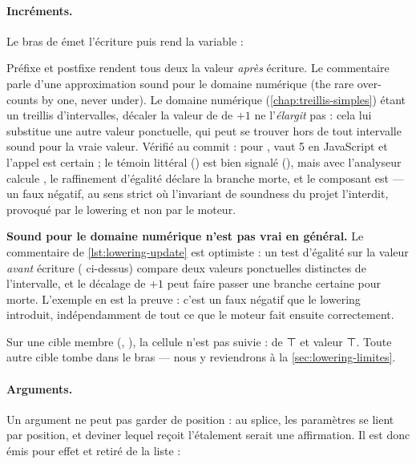 \paragraph{Incréments.} Le bras de  émet l'écriture puis rend la variable :


Préfixe et postfixe rendent tous deux la valeur \emph{après} écriture. Le commentaire parle d'une approximation sound \og pour le domaine numérique\fg{} (\og the rare  over-counts by one, never under\fg{}). Le domaine numérique (\cref{chap:treillis-simples}) étant un treillis d'intervalles, décaler la valeur de  de $+1$ ne l'\emph{élargit} pas : cela lui substitue une autre valeur ponctuelle, qui peut se trouver hors de tout intervalle sound pour la vraie valeur. Vérifié au commit \snapshotCommit{} : pour ,  vaut 5 en JavaScript et l'appel est certain ; le témoin littéral () est bien signalé (), mais avec  l'analyseur calcule , le raffinement d'égalité déclare la branche  morte, et le composant est  --- un faux négatif, au sens strict où l'invariant de soundness du projet l'interdit, provoqué par le lowering et non par le moteur.

\begin{piege}
\textbf{\og Sound pour le domaine numérique\fg{} n'est pas vrai en général.} Le commentaire de \cref{lst:lowering-update} est optimiste : un test d'égalité sur la valeur \emph{avant} écriture ( ci-dessus) compare deux valeurs ponctuelles distinctes de l'intervalle, et le décalage de $+1$ peut faire passer une branche certaine pour morte. L'exemple  en est la preuve : c'est un faux négatif que le lowering introduit, indépendamment de tout ce que le moteur fait ensuite correctement.
\end{piege}

Sur une cible membre (, ), la cellule n'est pas suivie :  de ⊤ et valeur ⊤. Toute autre cible tombe dans le bras  --- nous y reviendrons à la \cref{sec:lowering-limites}.

\paragraph{Arguments.} Un argument  ne peut pas garder de position : au splice, les paramètres se lient par position, et deviner lequel reçoit l'étalement serait une affirmation. Il est donc émis pour effet et retiré de la liste :

